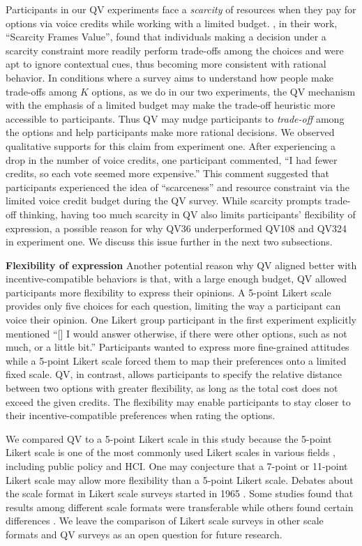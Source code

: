 Participants in our QV experiments face a \textit{scarcity} of resources when they pay for options via voice credits while working with a limited budget. \textcite{Shah2015a}, in their work, ``Scarcity Frames Value'', found that individuals making a decision under a scarcity constraint more readily perform trade-offs among the choices and were apt to ignore contextual cues, thus becoming more consistent with rational behavior. In conditions where a survey aims to understand how people make trade-offs among $K$ options, as we do in our two experiments, the QV mechanism with the emphasis of a limited budget may make the trade-off heuristic more accessible to participants. Thus QV may nudge participants to \textit{trade-off} among the options and help participants make more rational decisions. We observed qualitative supports for this claim from experiment one. After experiencing a drop in the number of voice credits, one participant commented, ``I had fewer credits, so each vote seemed more expensive.'' This comment suggested that participants experienced the idea of ``scarceness'' and resource constraint via the limited voice credit budget during the QV survey. While scarcity prompts trade-off thinking, having too much scarcity in QV also limits participants' flexibility of expression, a possible reason for why QV36 underperformed QV108 and QV324 in experiment one. We discuss this issue further in the next two subsections.

\textbf{Flexibility of expression}
Another potential reason why QV aligned better with incentive-compatible behaviors is that, with a large enough budget, QV allowed participants more flexibility to express their opinions. A 5-point Likert scale provides only five choices for each question, limiting the way a participant can voice their opinion. One Likert group participant in the first experiment explicitly mentioned ``[\textellipsis] I would answer otherwise, if there were other options, such as not much, or a little bit.'' Participants wanted to express more fine-grained attitudes while a 5-point Likert scale forced them to map their preferences onto a limited fixed scale. QV, in contrast, allows participants to specify the relative distance between two options with greater flexibility, as long as the total cost does not exceed the given credits. The flexibility may enable participants to stay closer to their incentive-compatible preferences when rating the options.

We compared QV to a 5-point Likert scale in this study because the 5-point Likert scale is one of the most commonly used Likert scales in various fields \cite{malhotra2006basic}, including public policy and HCI. One may conjecture that a 7-point or 11-point Likert scale may allow more flexibility than a 5-point Likert scale. Debates about the scale format in Likert scale surveys started in 1965 \cite{komorita1965number}. Some studies found that results among different scale formats were transferable while others found certain differences \cite{dawes2008data}. We leave the comparison of Likert scale surveys in other scale formats and QV surveys as an open question for future research.

